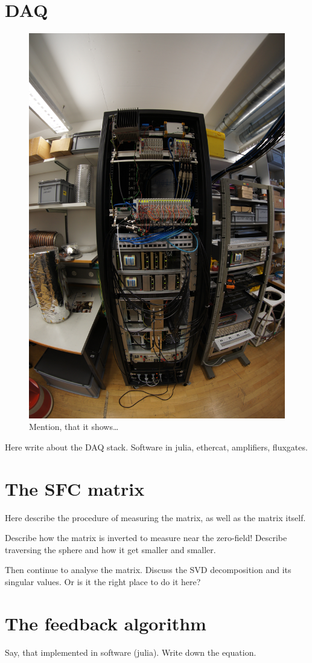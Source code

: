 \section{DAQ}

\begin{figure}
  \centering
  \includegraphics[width=0.6\linewidth,angle=90]{gfx/prototype/DSC03477.JPG}
  \caption{Mention, that it shows\ldots}
  \label{fig:prototype_photo_daq}
\end{figure}


Here write about the DAQ stack. Software in julia, ethercat, amplifiers, fluxgates.


\section{The SFC matrix}
Here describe the procedure of measuring the matrix, as well as the matrix itself.

Describe how the matrix is inverted to measure near the zero-field! Describe traversing the sphere and how it get smaller and smaller.

Then continue to analyse the matrix. Discuss the SVD decomposition and its singular values. Or is it the right place to do it here?


\section{The feedback algorithm}
Say, that implemented in software (julia). Write down the equation.


